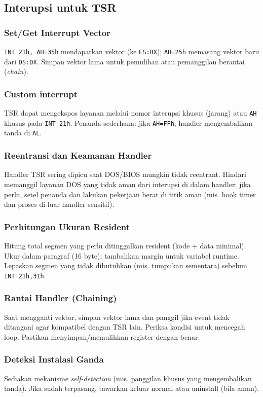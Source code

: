 \documentclass[../main.tex]{subfiles}
\begin{document}
        \subsection{Interupsi untuk TSR}
            \subsubsection{Set/Get Interrupt Vector}
                \texttt{INT 21h, AH=35h} mendapatkan vektor (ke \texttt{ES:BX}); \texttt{AH=25h} memasang vektor baru dari \texttt{DS:DX}. Simpan vektor lama untuk pemulihan atau pemanggilan berantai (\textit{chain}).

            \subsubsection{Custom interrupt}
                TSR dapat mengekspos layanan melalui nomor interupsi khusus (jarang) atau \texttt{AH} khusus pada \texttt{INT 21h}. Penanda sederhana: jika \texttt{AH=FFh}, handler mengembalikan tanda di \texttt{AL}.

            \subsubsection{Reentransi dan Keamanan Handler}
                Handler TSR sering dipicu saat DOS/BIOS mungkin tidak reentrant. Hindari memanggil layanan DOS yang tidak aman dari interupsi di dalam handler; jika perlu, setel penanda dan lakukan pekerjaan berat di titik aman (mis. hook timer dan proses di luar handler sensitif). 
            \subsubsection{Perhitungan Ukuran Resident}
                Hitung total segmen yang perlu ditinggalkan resident (kode + data minimal). Ukur dalam paragraf (16 byte); tambahkan margin untuk variabel runtime. Lepaskan segmen yang tidak dibutuhkan (mis. tumpukan sementara) sebelum \texttt{INT 21h,31h}. 
            \subsubsection{Rantai Handler (Chaining)}
                Saat mengganti vektor, simpan vektor lama dan panggil jika event tidak ditangani agar kompatibel dengan TSR lain. Periksa kondisi untuk mencegah loop. Pastikan menyimpan/memulihkan register dengan benar. 
            \subsubsection{Deteksi Instalasi Ganda}
                Sediakan mekanisme \textit{self-detection} (mis. panggilan khusus yang mengembalikan tanda). Jika sudah terpasang, tawarkan keluar normal atau uninstall (bila aman). 
\end{document}
